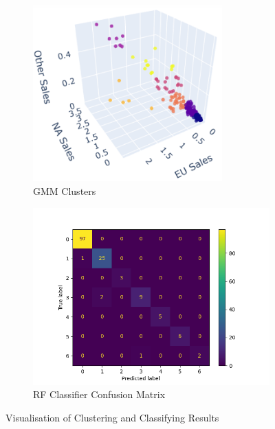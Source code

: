 \documentclass[english]{article}
\begin{document}
\begin{figure}[h]
    \begin{subfigure}{0.5\textwidth}
        \includegraphics[width=0.8\textwidth]{img/gmm_scatter.png} 
        \caption{GMM Clusters}
        \label{fig:subim1}
    \end{subfigure}
    \begin{subfigure}{0.5\textwidth}
        \includegraphics[width=1\textwidth]{img/confusion_matrix.png}
        \caption{RF Classifier Confusion Matrix}
        \label{fig:subim2}
    \end{subfigure}
    
    \caption{Visualisation of Clustering and Classifying Results}
    \label{fig:image2}
\end{figure}
\end{document}
